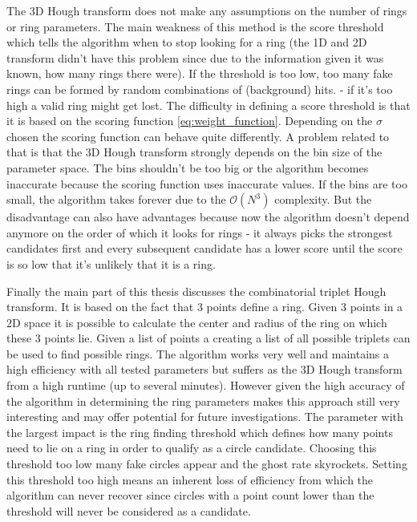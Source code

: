 \documentclass[11pt,twoside]{scrreprt}
\begin{document}
The 3D Hough transform does not make any assumptions on the number of rings or ring parameters. The main weakness
of this method is the score threshold which tells the algorithm when to stop looking for a ring (the 1D and 2D transform didn't
have this problem since due to the information given it was known, how many rings there were). If the threshold is too low, too many 
fake rings can be formed by random combinations of (background) hits. - if it's too high a valid ring might get lost. The difficulty in defining a score threshold is 
that it is based on the scoring function \ref{eq:weight_function}. Depending on the $\sigma$ chosen the scoring function can behave
quite differently. A problem related to that is that the 3D Hough transform strongly depends on the bin size of the parameter space.
The bins shouldn't be too big or the algorithm becomes inaccurate because the scoring function uses inaccurate values. If the bins are too
small, the algorithm takes forever due to the $\mathcal{O}(N^3)$ complexity. But the disadvantage can also have advantages because
now the algorithm doesn't depend anymore on the order of which it looks for rings - it always picks the strongest candidates first
and every subsequent candidate has a lower score until the score is so low that it's unlikely that it is a ring.

Finally the main part of this thesis discusses the combinatorial triplet Hough transform. It is based on the fact that 3 points define a ring.
Given 3 points in a 2D space it is possible to calculate the center and radius of the ring on which these 3 points lie. Given a list
of points a creating a list of all possible triplets can be used to find possible rings. The algorithm works very well and maintains a high efficiency
with all tested parameters but suffers as the 3D Hough transform from a high runtime (up to several minutes). However given the high accuracy
of the algorithm in determining the ring parameters makes this approach still very interesting and may offer potential for future investigations.
The parameter with the largest impact is the ring finding threshold which defines how many points need to lie on a ring in order to qualify as a 
circle candidate. Choosing this threshold too low many fake circles appear and the ghost rate skyrockets. Setting this threshold too high
means an inherent loss of efficiency from which the algorithm can never recover since circles with a point count lower than the threshold
will never be considered as a candidate.
\end{document}
